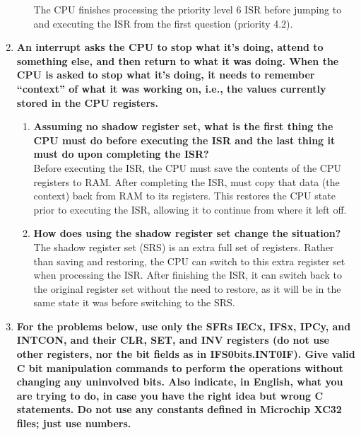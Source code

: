 \documentclass{article}
\begin{document}
\begin{enumerate}[label=\textbf{\arabic*})]
\begin{enumerate}[label=\textbf{\alph*}.]
        The CPU finishes processing the priority level 6 ISR before jumping to and executing the ISR from
        the first question (priority 4.2).


    \end{enumerate}

    \item \textbf{An interrupt asks the CPU to stop what it’s doing, attend to something else, and then
    return to what it was doing. When the CPU is asked to stop what it’s doing, it needs to
    remember “context” of what it was working on, i.e., the values currently stored in the
    CPU registers.} \\

    \begin{enumerate}[label=\textbf{\alph*}.]
        \item \textbf{Assuming no shadow register set, what is the first thing the CPU must
        do before executing the ISR and the last thing it must do upon completing the ISR?} \\

        Before executing the ISR, the CPU must save the contents of the CPU registers to RAM. 
        After completing the ISR, must copy that data (the context) back from RAM to its 
        registers. This restores the CPU state prior to executing the ISR, allowing it to
        continue from where it left off. 

        \item \textbf{How does using the shadow register set change the situation?} \\
        
        The shadow register set (SRS) is an extra full set of registers. Rather than saving 
        and restoring, the CPU can switch to this extra register set when processing the ISR. 
        After finishing the ISR, it can switch back to the original register set without the 
        need to restore, as it will be in the same state it was before switching to the SRS.
    \end{enumerate}

    \pagebreak
    \setcounter{enumi}{7}
    \item \textbf{For the problems below, use only the SFRs IECx, IFSx, IPCy, and INTCON, and their
    CLR, SET, and INV registers (do not use other registers, nor the bit fields as in
    IFS0bits.INT0IF). Give valid C bit manipulation commands to perform the operations
    without changing any uninvolved bits. Also indicate, in English, what you are trying to
    do, in case you have the right idea but wrong C statements. Do not use any constants
    defined in Microchip XC32 files; just use numbers.} \\


\end{enumerate}
\end{document}
